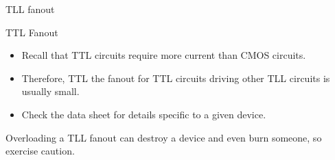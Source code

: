\begin{frame}{TLL fanout}
  \begin{block}{TTL Fanout}
    \begin{itemize}
      \item Recall that TTL circuits require more current than CMOS circuits.
      \item Therefore, TTL the fanout for TTL circuits driving other TLL circuits is usually small.
      \item Check the data sheet for details specific to a given device.
    \end{itemize}
  \end{block}
  Overloading a TLL fanout can destroy a device and even burn someone, so exercise caution.
\end{frame}


